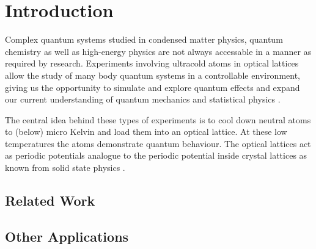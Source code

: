 \chapter{Introduction}

Complex quantum systems studied in condensed matter physics, quantum chemistry
as well as high-energy physics are not always accessable in a manner as
required by research. Experiments involving ultracold atoms in optical
lattices allow the study of many body quantum systems in a controllable
environment, giving us the opportunity to simulate and explore quantum
effects and expand our current understanding of quantum mechanics and
statistical physics \cite{Gross2017}.

The central idea behind these types of experiments is to cool down neutral
atoms to (below) micro Kelvin and load them into an optical lattice. At these
low temperatures the atoms demonstrate quantum behaviour. The optical lattices
act as periodic potentials analogue to the periodic potential inside crystal
lattices as known from solid state physics \cite{Lewenstein2007}.

\section{Related Work}

\section{Other Applications}
